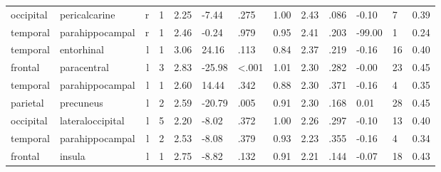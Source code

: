 \documentclass{article}
\begin{document}
\begin{longtable}{llrR{1.3cm}R{1cm}R{1.3cm}R{1cm}R{1cm}R{1.3cm}R{1cm}R{1.8cm}R{1.3cm}R{1.8cm}}
 occipital &             pericalcarine &    r &         1 &                  2.25 &            -7.44 &               .275 &                               1.00 &                          2.43 &                            .086 &  -0.10 &      7 &      0.39 \\
  temporal &           parahippocampal &    r &         1 &                  2.46 &            -0.24 &               .979 &                               0.95 &                          2.41 &                            .203 & -99.00 &      1 &      0.24 \\
  temporal &                entorhinal &    l &         1 &                  3.06 &            24.16 &               .113 &                               0.84 &                          2.37 &                            .219 &  -0.16 &     16 &      0.40 \\
   frontal &               paracentral &    l &         3 &                  2.83 &           -25.98 &      \textless.001 &                               1.01 &                          2.30 &                            .282 &  -0.00 &     23 &      0.45 \\
  temporal &           parahippocampal &    l &         1 &                  2.60 &            14.44 &               .342 &                               0.88 &                          2.30 &                            .371 &  -0.16 &      4 &      0.35 \\
  parietal &                 precuneus &    l &         2 &                  2.59 &           -20.79 &               .005 &                               0.91 &                          2.30 &                            .168 &   0.01 &     28 &      0.45 \\
 occipital &          lateraloccipital &    l &         5 &                  2.20 &            -8.02 &               .372 &                               1.00 &                          2.26 &                            .297 &  -0.10 &     13 &      0.40 \\
  temporal &           parahippocampal &    l &         2 &                  2.53 &            -8.08 &               .379 &                               0.93 &                          2.23 &                            .355 &  -0.16 &      4 &      0.34 \\
   frontal &                    insula &    l &         1 &                  2.75 &            -8.82 &               .132 &                               0.91 &                          2.21 &                            .144 &  -0.07 &     18 &      0.43 \\

\end{longtable}
\end{document}
